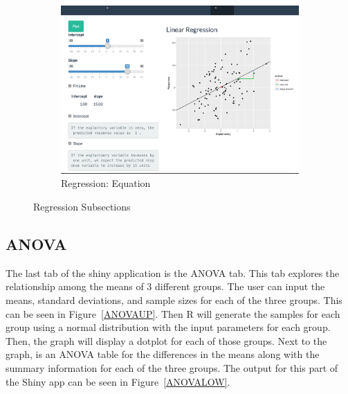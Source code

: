 \documentclass[11pt]{book}
\begin{document}
\begin{figure}
        \begin{subfigure}[b]{0.6\textwidth}
                \includegraphics[width=\textwidth]{LinEq.png}
                \caption{Regression: Equation} 
                \label{fig: LinEq}
        \end{subfigure}
        

\caption {Regression Subsections}
\end{figure}


\subsection{ANOVA}

The last tab of the shiny application is the ANOVA tab.  This tab explores the relationship among the means of 3 different groups.  The user can input the means, standard deviations, and sample sizes for each of the three groups. This can be seen in Figure~\ref{ANOVAUP}. Then R will generate the samples for each group using a normal distribution with the input parameters for each group. Then, the graph will display a dotplot for each of those groups.  Next to the graph, is an ANOVA table for the differences in the means along with the summary information for each of the three groups. The output for this part of the Shiny app can be seen in Figure~\ref{ANOVALOW}.
\end{document}
